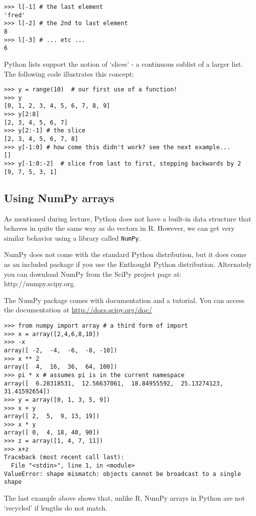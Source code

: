 \documentclass{article}
\begin{document}
\begin{lstlisting}
>>> l[-1] # the last element
'fred'
>>> l[-2] # the 2nd to last element
8
>>> l[-3] # ... etc ...
6
\end{lstlisting}
Python lists support the notion of `slices' - a continuous sublist of a
larger list. The following code illustrates this concept:

\begin{lstlisting}
>>> y = range(10)  # our first use of a function!
>>> y
[0, 1, 2, 3, 4, 5, 6, 7, 8, 9]
>>> y[2:8]
[2, 3, 4, 5, 6, 7]
>>> y[2:-1] # the slice
[2, 3, 4, 5, 6, 7, 8]
>>> y[-1:0] # how come this didn't work? see the next example...
[]
>>> y[-1:0:-2]  # slice from last to first, stepping backwards by 2
[9, 7, 5, 3, 1]
\end{lstlisting}
\subsection{Using NumPy arrays}

As mentioned during lecture, Python does not have a built-in data
structure that behaves in quite the same way as do vectors in R.
However, we can get very similar behavior using a library called
\lstinline!NumPy!.

NumPy does not come with the standard Python distribution, but it does
come as an included package if you use the Enthought Python
distribution. Alternately you can download NumPy from the SciPy project
page at: http://numpy.scipy.org.

The NumPy package comes with documentation and a tutorial. You can
access the documentation at \url{http://docs.scipy.org/doc/}

\begin{lstlisting}
>>> from numpy import array # a third form of import 
>>> x = array([2,4,6,8,10])
>>> -x
array([ -2,  -4,  -6,  -8, -10])
>>> x ** 2
array([  4,  16,  36,  64, 100])
>>> pi * x # assumes pi is in the current namespace
array([  6.28318531,  12.56637061,  18.84955592,  25.13274123,  31.41592654])
>>> y = array([0, 1, 3, 5, 9])
>>> x + y
array([ 2,  5,  9, 13, 19])
>>> x * y
array([ 0,  4, 18, 40, 90])
>>> z = array([1, 4, 7, 11])
>>> x+z
Traceback (most recent call last):
  File "<stdin>", line 1, in <module>
ValueError: shape mismatch: objects cannot be broadcast to a single shape
\end{lstlisting}
The last example above shows that, unlike R, NumPy arrays in Python are
not `recycled' if lengths do not match.
\end{document}
